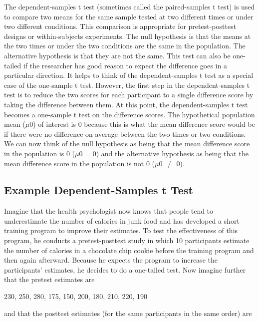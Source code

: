 The dependent-samples t test (sometimes called the paired-samples t test) is used to compare two means for the same sample tested at two different times or under two different conditions. This comparison is appropriate for pretest-posttest designs or within-subjects experiments. The null hypothesis is that the means at the two times or under the two conditions are the same in the population. The alternative hypothesis is that they are not the same. This test can also be one-tailed if the researcher has good reason to expect the difference goes in a particular direction.
It helps to think of the dependent-samples t test as a special case of the one-sample t test. However, the first step in the dependent-samples t test is to reduce the two scores for each participant to a single difference score by taking the difference between them. At this point, the dependent-samples t test becomes a one-sample t test on the difference scores. The hypothetical population mean ($\mu$0) of interest is 0 because this is what the mean difference score would be if there were no difference on average between the two times or two conditions. We can now think of the null hypothesis as being that the mean difference score in the population is 0 ($\mu$0 = 0) and the alternative hypothesis as being that the mean difference score in the population is not 0 ($\mu$0 $\neq$ 0).


\subsection{Example Dependent-Samples t Test}

Imagine that the health psychologist now knows that people tend to underestimate the number of calories in junk food and has developed a short training program to improve their estimates. To test the effectiveness of this program, he conducts a pretest-posttest study in which 10 participants estimate the number of calories in a chocolate chip cookie before the training program and then again afterward. Because he expects the program to increase the participants' estimates, he decides to do a one-tailed test. Now imagine further that the pretest estimates are


\begin{kframe}
230, 250, 280, 175, 150, 200, 180, 210, 220, 190

\end{kframe}

and that the posttest estimates (for the same participants in the same order) are


